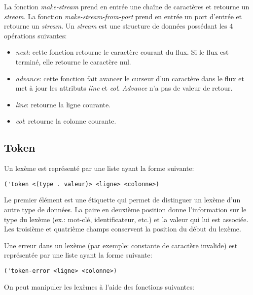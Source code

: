 \documentclass[11pt]{report}
\begin{document}
La fonction \emph{make-stream} prend en entrée une chaîne de
caractères et retourne un \emph{stream}.  La fonction
\emph{make-stream-from-port} prend en entrée un port d'entrée et
retourne un \emph{stream}.  Un \emph{stream} est une structure de
données possédant les 4 opérations suivantes:

\begin{itemize}
\item \emph{next}: cette fonction retourne le caractère courant du
  flux.  Si le flux est terminé, elle retourne le caractère nul.
\item \emph{advance}: cette fonction fait avancer le curseur d'un
  caractère dans le flux et met à jour les attributs \emph{line} et
  \emph{col}.  \emph{Advance} n'a pas de valeur de retour.
\item \emph{line}: retourne la ligne courante.
\item \emph{col}: retourne la colonne courante.
\end{itemize}


\subsection{Token}

Un lexème est représenté par une liste ayant la forme suivante:

\begin{verbatim}
('token <(type . valeur)> <ligne> <colonne>)
\end{verbatim}

Le premier élément est une étiquette qui permet de distinguer un
lexème d'un autre type de données.  La paire en deuxième position
donne l'information sur le type du lexème (ex.: mot-clé,
identificateur, etc.) et la valeur qui lui est associée.  Les
troisième et quatrième champs conservent la position du début du
lexème.

Une erreur dans un lexème (par exemple: constante de caractère
invalide) est représentée par une liste ayant la forme suivante:

\begin{verbatim}
('token-error <ligne> <colonne>)
\end{verbatim}


On peut manipuler les lexèmes à l'aide des fonctions suivantes:
\end{document}
